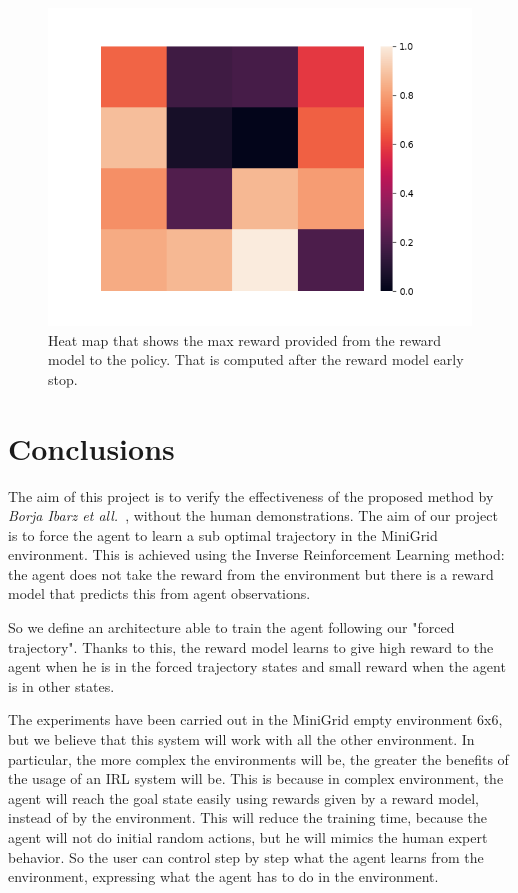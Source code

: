 \begin{figure}[t!]
    \includegraphics[width=\linewidth]{data/max_heatmap.png} 
    \caption{Heat map that shows the max reward provided from the reward model to the policy. That is computed after the reward model early stop.}
	\label{fig:heatmap}%
\end{figure}

\section{Conclusions}
The aim of this project is to verify the effectiveness of the proposed method by \textit{Borja Ibarz et all.}\ \cite{NIPS2018_8025}, without the human demonstrations. The aim of our project is to force the agent to learn a sub optimal trajectory in the MiniGrid environment. This is achieved using the Inverse Reinforcement Learning method: the agent does not take the reward from the environment but there is a reward model that predicts this from agent observations. 

So we define an architecture able to train the agent following our "forced trajectory". Thanks to this, the reward model learns to give high reward to the agent when he is in the forced trajectory states and small reward when the agent is in other states.

The experiments have been carried out in the MiniGrid empty environment 6x6, but we believe that this system will work with all the other environment. In particular, the more complex the environments will be, the greater the benefits of the usage of an IRL system will be. This is because in complex environment, the agent will reach the goal state easily using rewards given by a reward model, instead of by the environment. This will reduce the training time, because the agent will not do initial random actions, but he will mimics the human expert behavior. 
So the user can control step by step what the agent learns from the environment, expressing what the agent has to do in the environment.